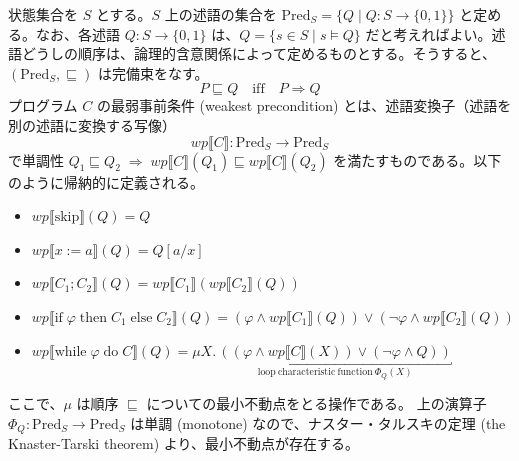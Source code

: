 \documentclass[
		head_space=20mm,
		foot_space=20mm,
		gutter=10mm,
		line_length=190mm
]{jlreq}
\begin{document}
\begin{definition}[最弱事前条件意味論]
	状態集合を $S$ とする。$S$ 上の述語の集合を $\mathrm{Pred}_S=\{Q\mid Q:S\to\{0,1\}\}$ と定める。なお、各述語 $Q:S\to\{0,1\}$ は、$Q=\{s\in S\mid s\models Q\}$ だと考えればよい。述語どうしの順序は、論理的含意関係によって定めるものとする。そうすると、$(\mathrm{Pred}_S,\sqsubseteq)$ は完備束をなす。\[P\sqsubseteq Q \quad\textrm{iff}\quad P\Rightarrow Q\] プログラム $C$ の最弱事前条件 (weakest precondition) とは、述語変換子（述語を別の述語に変換する写像） \[wp\llbracket C\rrbracket:\mathrm{Pred}_S\to\mathrm{Pred}_S\] で単調性 $Q_1\sqsubseteq Q_2 \;\Rightarrow\; wp\llbracket C\rrbracket(Q_1)\sqsubseteq wp\llbracket C\rrbracket(Q_2)$ を満たすものである。以下のように帰納的に定義される。
	\begin{itemize}
		\item $wp\llbracket\textrm{skip}\rrbracket(Q)=Q$
		\item $wp\llbracket x:=a\rrbracket(Q)=Q[a/x]$
		\item $wp\llbracket C_1;C_2\rrbracket(Q)=wp\llbracket C_1\rrbracket(wp\llbracket C_2\rrbracket(Q))$
		\item $wp\llbracket\mathrm{if}\;\varphi\;\mathrm{then}\;C_1\;\mathrm{else}\;C_2\rrbracket(Q)=(\varphi\land wp\llbracket C_1\rrbracket(Q))\lor(\lnot\varphi\land wp\llbracket C_2\rrbracket(Q))$
		\item $wp\llbracket\mathrm{while}\;\varphi\;\mathrm{do}\;C\rrbracket(Q)=\mu X.\,\underbracket{((\varphi\land wp\llbracket C\rrbracket(X))\lor(\lnot\varphi\land Q))}_{\mathrm{loop~characteristic~function~} \Phi_Q(X)}$
	\end{itemize}
\end{definition}

\begin{remark}
	ここで、$\mu$ は順序 $\sqsubseteq$ についての最小不動点をとる操作である。
	上の演算子 $\Phi_Q:\mathrm{Pred}_S\to\mathrm{Pred}_S$ は単調 (monotone) なので、ナスター・タルスキの定理 (the Knaster-Tarski theorem) より、最小不動点が存在する。
\end{remark}

\clearpage
\end{document}
